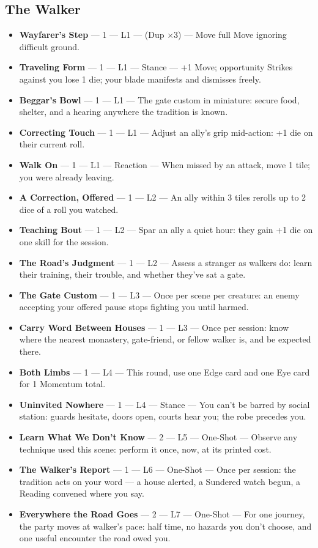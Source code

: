 \subsection{The Walker}
\begin{itemize}
    \item \textbf{Wayfarer's Step} --- 1 --- L1 --- (Dup ×3) --- Move full Move ignoring difficult ground.
    \item \textbf{Traveling Form} --- 1 --- L1 --- Stance --- +1 Move; opportunity Strikes against you lose 1 die; your blade manifests and dismisses freely.
    \item \textbf{Beggar's Bowl} --- 1 --- L1 --- The gate custom in miniature: secure food, shelter, and a hearing anywhere the tradition is known.
    \item \textbf{Correcting Touch} --- 1 --- L1 --- Adjust an ally's grip mid-action: +1 die on their current roll.
    \item \textbf{Walk On} --- 1 --- L1 --- Reaction --- When missed by an attack, move 1 tile; you were already leaving.
    \item \textbf{A Correction, Offered} --- 1 --- L2 --- An ally within 3 tiles rerolls up to 2 dice of a roll you watched.
    \item \textbf{Teaching Bout} --- 1 --- L2 --- Spar an ally a quiet hour: they gain +1 die on one skill for the session.
    \item \textbf{The Road's Judgment} --- 1 --- L2 --- Assess a stranger as walkers do: learn their training, their trouble, and whether they've sat a gate.
    \item \textbf{The Gate Custom} --- 1 --- L3 --- Once per scene per creature: an enemy accepting your offered pause stops fighting you until harmed.
    \item \textbf{Carry Word Between Houses} --- 1 --- L3 --- Once per session: know where the nearest monastery, gate-friend, or fellow walker is, and be expected there.
    \item \textbf{Both Limbs} --- 1 --- L4 --- This round, use one Edge card and one Eye card for 1 Momentum total.
    \item \textbf{Uninvited Nowhere} --- 1 --- L4 --- Stance --- You can't be barred by social station: guards hesitate, doors open, courts hear you; the robe precedes you.
    \item \textbf{Learn What We Don't Know} --- 2 --- L5 --- One-Shot --- Observe any technique used this scene: perform it once, now, at its printed cost.
    \item \textbf{The Walker's Report} --- 1 --- L6 --- One-Shot --- Once per session: the tradition acts on your word --- a house alerted, a Sundered watch begun, a Reading convened where you say.
    \item \textbf{Everywhere the Road Goes} --- 2 --- L7 --- One-Shot --- For one journey, the party moves at walker's pace: half time, no hazards you don't choose, and one useful encounter the road owed you.
\end{itemize}

